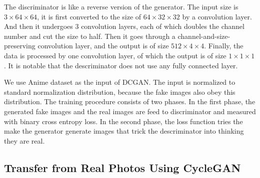 \documentclass[10pt,twocolumn,letterpaper]{article}
\begin{document}
The discriminator is like a reverse version of the generator. The input size is
$3\times 64\times 64$, it is first converted to the size of
$64\times 32\times 32$ by a convolution layer. And then it undergoes 3
convolution layers, each of which doubles the channel number and cut the size to
half. Then it goes through a channel-and-size-preserving convolution layer, and
the output is of size $512\times 4\times 4$. Finally, the data is processed by
one convolution layer, of which the output is of size $1\times 1\times 1$. It is
notable that the descriminator does not use any fully connected layer.

We use Anime dataset as the input of DCGAN. The input is normalized to standard
normalization distribution, because the fake images also obey this distribution.
The training procedure consists of two phases. In the first phase, the generated
fake images and the real images are feed to discriminator and measured with
binary cross entropy loss. In the second phase, the loss function tries the make
the generator generate images that trick the descriminator into thinking they
are real.

\subsection{Transfer from Real Photos Using CycleGAN}
\end{document}
